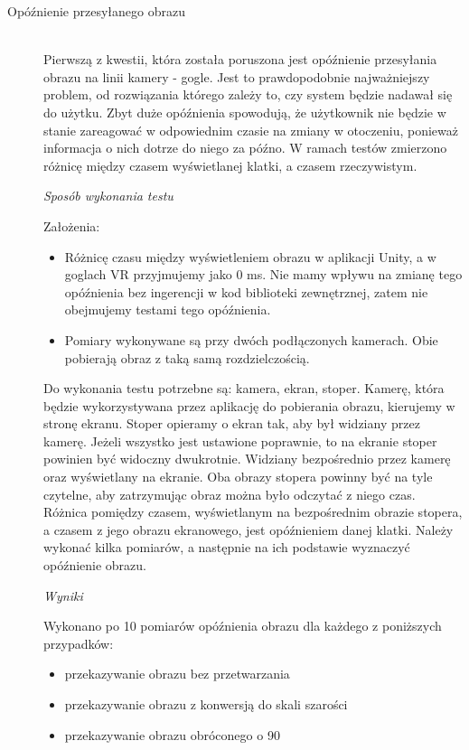 \documentclass[a4paper,11pt,twoside]{report}
\theoremstyle{definition}
\begin{document}
\begin{description}
\item[Opóźnienie przesyłanego obrazu] \hfill \\
Pierwszą z kwestii, która została poruszona jest opóźnienie przesyłania obrazu na linii kamery - gogle. Jest to prawdopodobnie najważniejszy problem, od rozwiązania którego zależy to, czy system będzie nadawał się do użytku. Zbyt duże opóźnienia spowodują, że użytkownik nie będzie w stanie zareagować w odpowiednim czasie na zmiany w otoczeniu, ponieważ informacja o nich dotrze do niego za późno. W ramach testów zmierzono różnicę między czasem wyświetlanej klatki, a czasem rzeczywistym.

\textit{Sposób wykonania testu}

Założenia:
\begin{itemize}
\item Różnicę czasu między wyświetleniem obrazu w aplikacji Unity, a w goglach VR przyjmujemy jako 0 ms. Nie mamy wpływu na zmianę tego opóźnienia bez ingerencji w kod biblioteki zewnętrznej, zatem nie obejmujemy testami tego opóźnienia.
\item Pomiary wykonywane są przy dwóch podłączonych kamerach. Obie pobierają obraz z taką samą rozdzielczością.
\end{itemize}

Do wykonania testu potrzebne są: kamera, ekran, stoper. Kamerę, która będzie wykorzystywana przez aplikację do pobierania obrazu, kierujemy w stronę ekranu. Stoper opieramy o ekran tak, aby był widziany przez kamerę. Jeżeli wszystko jest ustawione poprawnie, to na ekranie stoper powinien być widoczny dwukrotnie. Widziany bezpośrednio przez kamerę oraz wyświetlany na ekranie. Oba obrazy stopera powinny być na tyle czytelne, aby zatrzymując obraz można było odczytać z niego czas.
Różnica pomiędzy czasem, wyświetlanym na bezpośrednim obrazie stopera, a czasem z jego obrazu ekranowego, jest opóźnieniem danej klatki.
Należy wykonać kilka pomiarów, a następnie na ich podstawie wyznaczyć opóźnienie obrazu.

\textit{Wyniki}

Wykonano po 10 pomiarów opóźnienia obrazu dla każdego z poniższych przypadków:
\begin{itemize}
\item przekazywanie obrazu bez przetwarzania
\item przekazywanie obrazu z konwersją do skali szarości
\item przekazywanie obrazu obróconego o 90\textdegree
\end{itemize}


\end{description}
\end{document}
